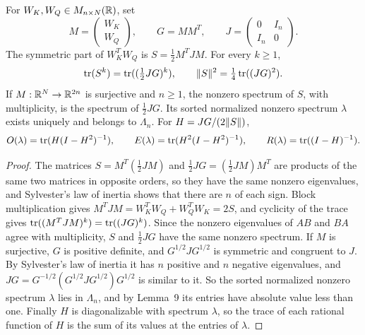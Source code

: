 \begin{lemma}
\label{lem:gram}
\leanok
{}
For $W_K,W_Q\in M_{n\times N}(\mathbb{R})$, set
\[
 M=\begin{pmatrix}W_K\\W_Q\end{pmatrix},\qquad
 G=MM^T,\qquad J=\begin{pmatrix}0&I_n\\I_n&0\end{pmatrix}.
\]
The symmetric part of $W_K^TW_Q$ is $S=\tfrac12M^TJM$. For every
$k\ge1$,
\[
 \operatorname{tr}(S^k)=\operatorname{tr}((\tfrac12JG)^k),\qquad
 \lVert S\rVert^2=\tfrac14\operatorname{tr}((JG)^2).
\]
If $M:\mathbb{R}^N\to\mathbb{R}^{2n}$ is surjective and $n\ge1$, the nonzero spectrum
of $S$, with multiplicity, is the spectrum of $\tfrac12JG$. Its
sorted normalized nonzero spectrum $\lambda$ exists uniquely and
belongs to $\Lambda_n$. For $H=JG/(2\lVert S\rVert)$,
\[
 O(\lambda)=\operatorname{tr}(H(I-H^2)^{-1}),\qquad
 E(\lambda)=\operatorname{tr}(H^2(I-H^2)^{-1}),\qquad
 R(\lambda)=\operatorname{tr}((I-H)^{-1}).
\]
\end{lemma}
\begin{proof}
\leanok
{}
The matrices $S=M^T(\tfrac12JM)$ and $\tfrac12JG=(\tfrac12JM)M^T$ are
products of the same two matrices in opposite orders, so they have the
same nonzero eigenvalues, and Sylvester's law of inertia shows that there
are $n$ of each sign. Block multiplication gives
$M^TJM=W_K^TW_Q+W_Q^TW_K=2S$, and cyclicity of the trace gives
$\operatorname{tr}((M^TJM)^k)=\operatorname{tr}((JG)^k)$. Since the nonzero eigenvalues of $AB$ and
$BA$ agree with multiplicity, $S$ and $\tfrac12JG$ have the same nonzero
spectrum. If $M$ is surjective, $G$ is positive definite, and
$G^{1/2}JG^{1/2}$ is symmetric and congruent to $J$. By Sylvester's law of
inertia it has $n$ positive and $n$ negative eigenvalues, and
$JG=G^{-1/2}(G^{1/2}JG^{1/2})G^{1/2}$ is similar to it. So the sorted
normalized nonzero spectrum $\lambda$ lies in $\Lambda_n$, and by Lemma~9
its entries have absolute value less than one. Finally $H$ is
diagonalizable with spectrum $\lambda$, so the trace of each rational
function of $H$ is the sum of its values at the entries of $\lambda$.
\end{proof}
